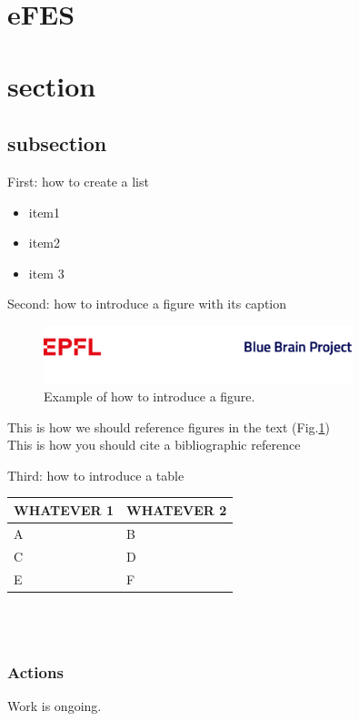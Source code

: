
\section{eFES}

\section{section}

\subsection{subsection}

First: how to create a list
\begin{itemize}
\item item1
\item item2
\item item 3
\end{itemize}

Second: how to introduce a figure with its caption
\begin{figure}[h!]
\includegraphics[width=0.8\textwidth]{figs/Last.png}
\caption{Example of how to introduce a figure.}
\label{fig_test}
\end{figure}


This is how we should reference figures in the text (Fig.\ref{fig_test}) \\

This is how you should cite a bibliographic reference \citet{richardson2008measurement}

Third: how to introduce a table\\

\begin{tabular}{ | p{5cm} | p{5cm} |}\hline
WHATEVER 1 & WHATEVER 2 \\ \hline
A & B\\ \hline
C & D\\ \hline
E & F\\ \hline
\end{tabular}\\ \\


\subsubsection{Actions}
Work is ongoing.


{}
